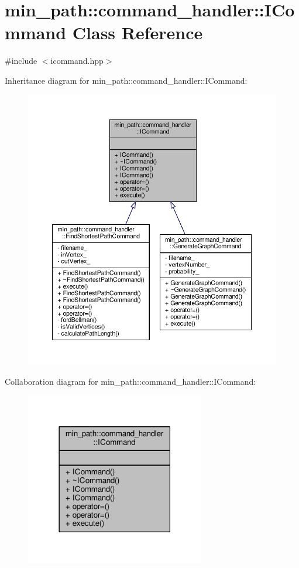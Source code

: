 \hypertarget{a00008}{}\section{min\+\_\+path\+:\+:command\+\_\+handler\+:\+:I\+Command Class Reference}
\label{a00008}


{\ttfamily \#include $<$icommand.\+hpp$>$}



Inheritance diagram for min\+\_\+path\+:\+:command\+\_\+handler\+:\+:I\+Command\+:
\nopagebreak
\begin{figure}[H]
\begin{center}
\leavevmode
\includegraphics[width=350pt]{d9/da4/a00078}
\end{center}
\end{figure}


Collaboration diagram for min\+\_\+path\+:\+:command\+\_\+handler\+:\+:I\+Command\+:
\nopagebreak
\begin{figure}[H]
\begin{center}
\leavevmode
\includegraphics[width=222pt]{d1/d51/a00079}
\end{center}
\end{figure}
